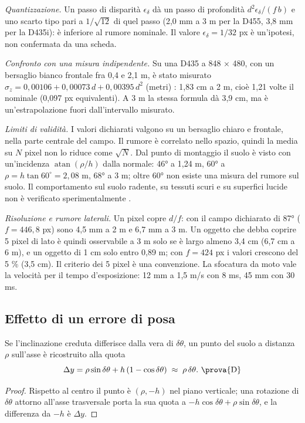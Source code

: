 \emph{Quantizzazione.} Un passo di disparità $\epsilon_\delta$ dà un passo di profondità $d^2\epsilon_\delta/(f\,b)$ e uno scarto tipo pari a $1/\sqrt{12}$ di quel passo (2,0 mm a 3 m per la D455, 3,8 mm per la D435i): è inferiore al rumore nominale. Il valore $\epsilon_\delta=1/32$ px è un'ipotesi, non confermata da una scheda.

\emph{Confronto con una misura indipendente.} Su una D435 a 848 × 480, con un bersaglio bianco frontale fra 0,4 e 2,1 m, è stato misurato $\sigma_z=0{,}00106+0{,}00073\,d+0{,}00395\,d^2$ (metri) \cite{ahn2019}: 1,83 cm a 2 m, cioè 1,21 volte il nominale (0,097 px equivalenti). A 3 m la stessa formula dà 3,9 cm, ma è un'estrapolazione fuori dall'intervallo misurato.

\emph{Limiti di validità.} I valori dichiarati valgono su un bersaglio chiaro e frontale, nella parte centrale del campo. Il rumore è correlato nello spazio, quindi la media su $N$ pixel non lo riduce come $\sqrt N$. Dal punto di montaggio il suolo è visto con un'incidenza $\operatorname{atan}(\rho/h)$ dalla normale: 46° a 1,24 m, 60° a $\rho=h\tan 60^\circ=2{,}08$ m, 68° a 3 m; oltre 60° non esiste una misura del rumore sul suolo. Il comportamento sul suolo radente, su tessuti scuri e su superfici lucide non è verificato sperimentalmente .

\emph{Risoluzione e rumore laterali.} Un pixel copre $d/f$: con il campo dichiarato di 87° ($f=446{,}8$ px) sono 4,5 mm a 2 m e 6,7 mm a 3 m. Un oggetto che debba coprire 5 pixel di lato è quindi osservabile a 3 m solo se è largo almeno 3,4 cm (6,7 cm a 6 m), e un oggetto di 1 cm solo entro 0,89 m; con $f=424$ px i valori crescono del 5 \% (3,5 cm). Il criterio dei 5 pixel è una convenzione. La sfocatura da moto vale la velocità per il tempo d'esposizione: 12 mm a 1,5 m/s con 8 ms, 45 mm con 30 ms. 

\subsection{Effetto di un errore di posa}\label{sec:geo-posa}

\begin{proposizione}\label{prop:geo-posa}
Se l'inclinazione creduta differisce dalla vera di $\delta\theta$, un punto del suolo a distanza $\rho$ sull'asse è ricostruito alla quota
\begin{equation}\label{eq:geo-posa}
\Delta y=\rho\sin\delta\theta+h\,(1-\cos\delta\theta)\;\approx\;\rho\,\delta\theta.\ \text{\prova{D}}
\end{equation}
\end{proposizione}
\begin{proof}
Rispetto al centro il punto è $(\rho,-h)$ nel piano verticale; una rotazione di $\delta\theta$ attorno all'asse trasversale porta la sua quota a $-h\cos\delta\theta+\rho\sin\delta\theta$, e la differenza da $-h$ è $\Delta y$.
\end{proof}

